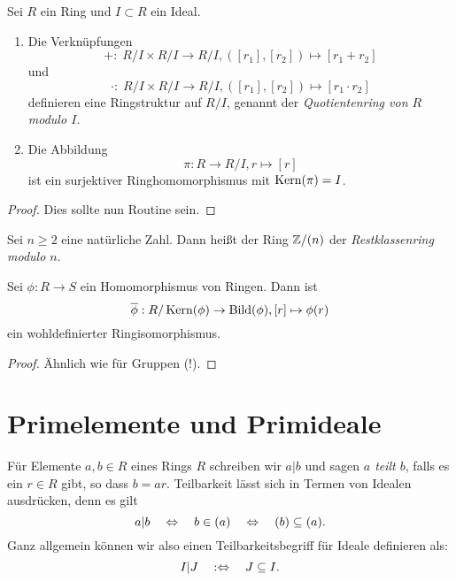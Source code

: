 \documentclass{book}
\begin{document}
\begin{prop}
    \label{prop:quot} Sei $R$ ein Ring und $I \subset R$ ein Ideal.
    \begin{enumerate}
        \item Die Verknüpfungen 
            \[
                +: \; R/I \times R/I \to R/I, ([r_1],[r_2]) \mapsto [r_1+r_2]
            \]
            und
            \[
                \cdot: \; R/I \times R/I \to R/I, ([r_1],[r_2]) \mapsto [r_1 \cdot r_2]
            \]
            definieren eine Ringstruktur auf $R/I$, genannt der \emph{Quotientenring von
            $R$ modulo $I$.} 
        \item Die Abbildung 
            \[
                \pi: R \to R/I, r \mapsto [r]
            \]
            ist ein surjektiver Ringhomomorphismus mit $\operatorname{Kern}(\pi) = I$. 
    \end{enumerate}
\end{prop}
\begin{proof}
   Dies sollte nun Routine sein. 
\end{proof}

\begin{exa}
    \label{exa:restklassen}
    Sei $n \ge 2$ eine natürliche Zahl. Dann heißt der Ring $\mathbb{Z}/(n)$ der
    \emph{Restklassenring modulo $n$}.
\end{exa}


\begin{thm}
    \label{thm:haupthom}
    Sei $\phi: R \to S$ ein Homomorphismus von Ringen. Dann ist 
    \[
        \overline{\phi}: R/\Kern(\phi) \to \Bild(\phi), [r] \mapsto \phi(r)
    \]
    ein wohldefinierter Ringisomorphismus.
\end{thm}
\begin{proof}
    Ähnlich wie für Gruppen (!).
\end{proof}

\section{Primelemente und Primideale}%
\label{sec:primideale}

Für Elemente $a,b \in R$ eines Rings $R$ schreiben wir $a|b$ und sagen {\em
$a$ teilt $b$}, falls es ein $r \in R$ gibt, so dass $b = a r$. Teilbarkeit
lässt sich in Termen von Idealen ausdrücken, denn es gilt
\[
    a | b \quad \Leftrightarrow \quad b \in (a) \quad \Leftrightarrow \quad (b) \subseteq (a).
\]
Ganz allgemein können wir also einen Teilbarkeitsbegriff für Ideale definieren als:
\[
    I | J \quad : \Leftrightarrow \quad J \subseteq I.
\]
\end{document}
